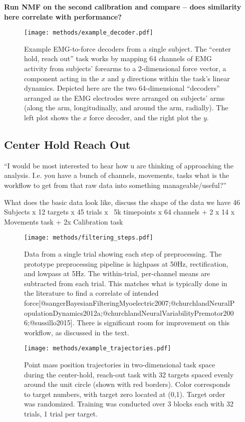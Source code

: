 \documentclass[../main.tex]{subfiles}
\begin{document}
\textbf{Run NMF on the second calibration and compare – does similarity here correlate with performance?}


\begin{figure}[tph]
  \centering
  \texttt{[image: methods/example\_decoder.pdf]}
  \caption[Example subject decoder]{Example EMG-to-force decoders from a single subject. The ``center hold, reach out'' task works by mapping 64 channels of EMG activity from subjects' forearms to a 2-dimensional force vector, a component acting in the $x$ and $y$ directions within the task's linear dynamics. Depicted here are the two 64-dimensional ``decoders'' arranged as the EMG electrodes were arranged on subjects' arms (along the arm, longitudinally, and around the arm, radially). The left plot shows the $x$ force decoder, and the right plot the $y$.}\label{fig:example_decoder}
\end{figure}



\subsection{Center Hold Reach Out}

``I would be most interested to hear how u are thinking of approaching the analysis. I.e. you have a bunch of channels, movements, tasks what is the workflow to get from that raw data into something manageable/useful?''

What does the basic data look like, discuss the shape of the data we have
46 Subjects x 12 targets x 45 trials x ~5k timepoints x 64 channels + 2 x 14 x Movements task + 2x Calibration task


\begin{figure}[tph]
  \centering
  \texttt{[image: methods/filtering\_steps.pdf]}
  \caption[Data filtering steps]{Data from a single trial showing each step of preprocessing. The prototype preprocessing pipeline is highpass at 50Hz, rectification, and lowpass at 5Hz. The within-trial, per-channel means are subtracted from each trial. This matches what is typically done in the literature to find a correlate of intended force[@sangerBayesianFilteringMyoelectric2007;@churchlandNeuralPopulationDynamics2012a;@churchlandNeuralVariabilityPremotor2006;@sussillo2015]. There is significant room for improvement on this workflow, as discussed in the text.}\label{fig:filtering}
\end{figure}

\begin{figure}[tph]
  \centering
  \texttt{[image: methods/example\_trajectories.pdf]}
  \caption{Point mass position trajectories in two-dimensional task space during the center-hold, reach-out task with 32 targets spaced evenly around the unit circle (shown with red borders). Color corresponds to target numbers, with target zero located at (0,1). Target order was randomized. Training was conducted over 3 blocks each with 32 trials, 1 trial per target.}\label{fig:example_trajectories}
\end{figure}
\end{document}
